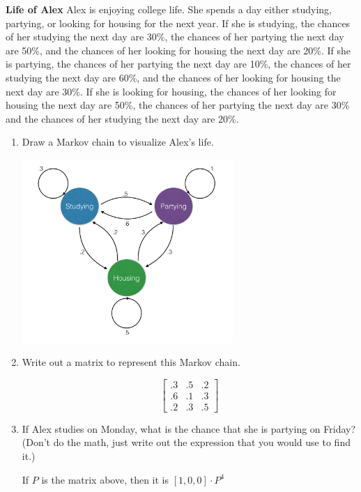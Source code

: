 \question \textbf{Life of Alex} \newline
Alex is enjoying college life. She spends a day either studying, 
partying, or looking for housing for the next year. If she is studying, 
the chances of her studying the next day are 30\%, the chances of her 
partying the next day are 50\%, and the chances of her looking for 
housing the next day are 20\%. If she is partying, the chances of her 
partying the next day are 10\%, the chances of her studying the next 
day are 60\%, and the chances of her looking for housing the next day 
are 30\%. If she is looking for housing, the chances of her looking 
for housing the next day are 50\%, the chances of her partying the 
next day are 30\% and the chances of her studying the next day are 20\%.

\begin{enumerate}[label=(\alph*)]
\item Draw a Markov chain to visualize Alex’s life.
\begin{solution}[5cm]
\includegraphics[width=8cm]{life_of_alex.jpg}
\end{solution}

\item Write out a matrix to represent this Markov chain.
\begin{solution}[3cm]
\[\begin{bmatrix}
.3 & .5 & .2 \\
.6 & .1 & .3\\
.2 & .3 & .5
\end{bmatrix}
\]
\end{solution}

\item If Alex studies on Monday, what is the chance that she is 
partying on Friday? (Don't do the math, just write out the expression 
that you would use to find it.)
\begin{solution}
If $P$ is the matrix above, then it is $[1, 0, 0] \cdot P^4$
\end{solution}
\clearpage


\end{enumerate}
